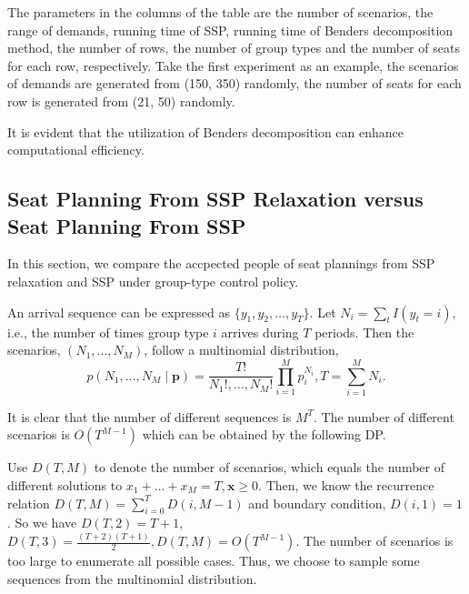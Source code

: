 The parameters in the columns of the table are the number of scenarios, the range of demands, running time of SSP, running time of Benders decomposition method, the number of rows, the number of group types and the number of seats for each row, respectively. Take the first experiment as an example, the scenarios of demands are generated from (150, 350) randomly, the number of seats for each row is generated from (21, 50) randomly.

It is evident that the utilization of Benders decomposition can enhance computational efficiency.




\subsection{Seat Planning From SSP Relaxation versus Seat Planning From SSP}
In this section, we compare the accpected people of seat plannings from SSP relaxation and SSP under group-type control policy.

An arrival sequence can be expressed as $\{y_{1}, y_{2}, \ldots, y_{T}\}$. Let $N_{i} = \sum_{t} I(y_t = i)$, i.e., the number of times group type $i$ arrives during $T$ periods. Then the scenarios, $(N_1, \ldots, N_{M})$, follow a multinomial distribution, $$p\left(N_1, \ldots, N_{M} \mid \mathbf{p}\right)=\frac{T !}{N_{1}!, \ldots, N_{M}!} \prod_{i=1}^{M} p_{i}^{N_i}, T = \sum_{i=1}^{M} N_{i}.$$

It is clear that the number of different sequences is $M^{T}$. The number of different scenarios is $O(T^{M-1})$ which can be obtained by the following DP.

Use $D(T, M) $ to denote the number of scenarios, which equals the number of different solutions to $x_{1}+\ldots + x_{M} = T, \mathbf{x} \geq 0$. Then, we know the recurrence relation $D(T, M) = \sum_{i= 0}^{T} D(i, M-1)$ and boundary condition, $D(i,1) = 1$. So we have $D(T,2) = T+1$, $D(T,3) = \frac{(T+2)(T+1)}{2}, D(T,M) = O(T^{M-1})$. The number of scenarios is too large to enumerate all possible cases. Thus, we choose to sample some sequences from the multinomial distribution.

